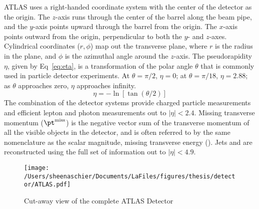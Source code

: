 ATLAS uses a right-handed coordinate system with the center of the detector as the origin.  The $z$-axis runs through the center of the barrel along the beam pipe, and the $y$-axis points upward through the barrel from the origin.  The $x$-axis points outward from the origin, perpendicular to both the $y$- and $z$-axes.  Cylindrical coordinates ($r,\phi$) map out the transverse plane, where $r$ is the radius in the plane, and $\phi$ is the azimuthal angle around the $z$-axis.  The pseudorapidity $\eta$, given by Eq~\ref{eq:eta}, is a transformation of the polar angle $\theta$ that is commonly used in particle detector experiments.  At $\theta=\pi/2$, $\eta=0$; at $\theta=\pi/18$, $\eta=2.88$; as $\theta$ approaches zero, $\eta$ approaches infinity.
\begin{equation}
\eta=-\ln[\tan(\theta/2)]
\label{eq:eta}
\end{equation}
The combination of the detector systems provide charged particle measurements and efficient lepton and photon measurements out to $|\eta| < 2.4$.  Missing transverse momentum ($\pt^{\mathrm{miss}}$) is the negative vector sum of the transverse momentum of all the visible objects in the detector, and is often referred to by the same nomenclature as the scalar magnitude, missing transverse energy (\met{}). Jets and \met{} are reconstructed using the full set of information out to $|\eta| < 4.9$.    \begin{figure}[tbp]
  \centering
 \texttt{[image: /Users/sheenaschier/Documents/LaFiles/figures/thesis/detector/ATLAS.pdf]}
    \caption{Cut-away view of the complete ATLAS Detector~\cite{Nayak:2012np}}
   \label{fig:ATLAS}
 \end{figure}

